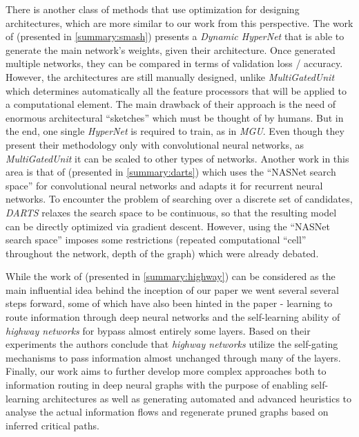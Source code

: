 \documentclass[11pt,a4paper]{article}
\begin{document}
There is another class of methods that use optimization for designing architectures, which are more similar to our work from this perspective. The work of \citet{brock2017smash} (presented in \ref{summary:smash}) presents a \textit{Dynamic HyperNet} that is able to generate the main network’s weights, given their architecture. Once generated multiple networks, they can be compared in terms of validation loss / accuracy. However, the architectures are still manually designed, unlike \textit{MultiGatedUnit} which determines automatically all the feature processors that will be applied to a computational element. The main drawback of their approach is the need of enormous architectural “sketches'' which must be thought of by humans. But in the end, one single \textit{HyperNet} is required to train, as in \textit{MGU}. Even though they present their methodology only with convolutional neural networks, as \textit{MultiGatedUnit} it can be scaled to other types of networks. Another work in this area is that of \citet{Liu2018} (presented in \ref{summary:darts}) which uses the “NASNet search space” for convolutional neural networks and adapts it for recurrent neural networks. To encounter the problem of searching over a discrete set of candidates, \textit{DARTS} relaxes the search space to be continuous, so that the resulting model can be directly optimized via gradient descent. However, using the “NASNet search space” imposes some restrictions (repeated computational “cell” throughout the network, depth of the graph) which were already debated. 

While the work of \citet{srivastava2015highway} (presented in \ref{summary:highway}) can be considered as the main influential idea behind the inception of our paper we went several several steps forward, some of which have also been hinted in the paper - learning to route information through deep neural networks and the self-learning ability of \textit{highway networks} for bypass almost entirely some layers. Based on their experiments the authors conclude that \textit{highway networks} utilize the self-gating mechanisms to pass information almost unchanged through many of the layers. Finally, our work aims to further develop more complex approaches both to information routing in deep neural graphs with the purpose of enabling self-learning architectures as well as generating automated and advanced heuristics to analyse the actual information flows and regenerate pruned graphs based on inferred critical paths.
\end{document}
